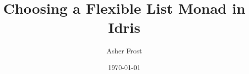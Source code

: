 \documentclass{article}
\begin{document}
\title{Choosing a Flexible List Monad in Idris}
\author{Asher Frost}
\date{\today}
\maketitle	
	
\begin{abstract}
	\todo{}
\end{abstract}	






\printbibliography
\end{document}
